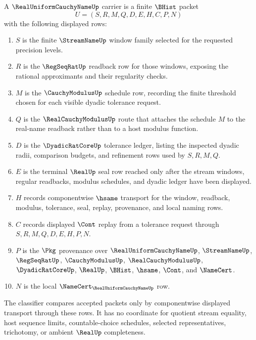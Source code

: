\begin{definition}
\label{def:real-uniform-cauchy-name-carrier}
A $\RealUniformCauchyNameUp$ carrier is a finite $\BHist$ packet
$$
U=(S,R,M,Q,D,E,H,C,P,N)
$$
with the following displayed rows:
\begin{enumerate}
\item $S$ is the finite $\StreamNameUp$ window family selected for the requested precision levels.
\item $R$ is the $\RegSeqRatUp$ readback row for those windows, exposing the rational approximants and their regularity checks.
\item $M$ is the $\CauchyModulusUp$ schedule row, recording the finite threshold chosen for each visible dyadic tolerance request.
\item $Q$ is the $\RealCauchyModulusUp$ route that attaches the schedule $M$ to the real-name readback rather than to a host modulus function.
\item $D$ is the $\DyadicRatCoreUp$ tolerance ledger, listing the inspected dyadic radii, comparison budgets, and refinement rows used by $S,R,M,Q$.
\item $E$ is the terminal $\RealUp$ seal row reached only after the stream windows, regular readbacks, modulus schedules, and dyadic ledger have been displayed.
\item $H$ records componentwise $\hsame$ transport for the window, readback, modulus, tolerance, seal, replay, provenance, and local naming rows.
\item $C$ records displayed $\Cont$ replay from a tolerance request through $S,R,M,Q,D,E,H,P,N$.
\item $P$ is the $\Pkg$ provenance over $\RealUniformCauchyNameUp$, $\StreamNameUp$, $\RegSeqRatUp$, $\CauchyModulusUp$, $\RealCauchyModulusUp$, $\DyadicRatCoreUp$, $\RealUp$, $\BHist$, $\hsame$, $\Cont$, and $\NameCert$.
\item $N$ is the local $\NameCert_{\RealUniformCauchyNameUp}$ row.
\end{enumerate}
The classifier compares accepted packets only by componentwise displayed transport through these rows. It has no coordinate for quotient stream equality, host sequence limits, countable-choice schedules, selected representatives, trichotomy, or ambient $\RealUp$ completeness.
\end{definition}

